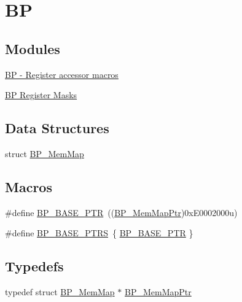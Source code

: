 \hypertarget{group___b_p___peripheral}{}\section{BP}
\label{group___b_p___peripheral}
\subsection*{Modules}
\begin{DoxyCompactItemize}
\item 
\hyperlink{group___b_p___register___accessor___macros}{B\+P -\/ Register accessor macros}
\item 
\hyperlink{group___b_p___register___masks}{B\+P Register Masks}
\end{DoxyCompactItemize}
\subsection*{Data Structures}
\begin{DoxyCompactItemize}
\item 
struct \hyperlink{struct_b_p___mem_map}{B\+P\+\_\+\+Mem\+Map}
\end{DoxyCompactItemize}
\subsection*{Macros}
\begin{DoxyCompactItemize}
\item 
\#define \hyperlink{group___b_p___peripheral_ga375cd6d2e7ec414f4e33cb54d5494940}{B\+P\+\_\+\+B\+A\+S\+E\+\_\+\+P\+TR}~((\hyperlink{group___b_p___peripheral_gaa250950ffe336f8c6e5895e3a1e4ca86}{B\+P\+\_\+\+Mem\+Map\+Ptr})0x\+E0002000u)
\item 
\#define \hyperlink{group___b_p___peripheral_ga6c07114ad41ccb42b134e8834f123598}{B\+P\+\_\+\+B\+A\+S\+E\+\_\+\+P\+T\+RS}~\{ \hyperlink{group___b_p___peripheral_ga375cd6d2e7ec414f4e33cb54d5494940}{B\+P\+\_\+\+B\+A\+S\+E\+\_\+\+P\+TR} \}
\end{DoxyCompactItemize}
\subsection*{Typedefs}
\begin{DoxyCompactItemize}
\item 
typedef struct \hyperlink{struct_b_p___mem_map}{B\+P\+\_\+\+Mem\+Map} $\ast$ \hyperlink{group___b_p___peripheral_gaa250950ffe336f8c6e5895e3a1e4ca86}{B\+P\+\_\+\+Mem\+Map\+Ptr}
\end{DoxyCompactItemize}


